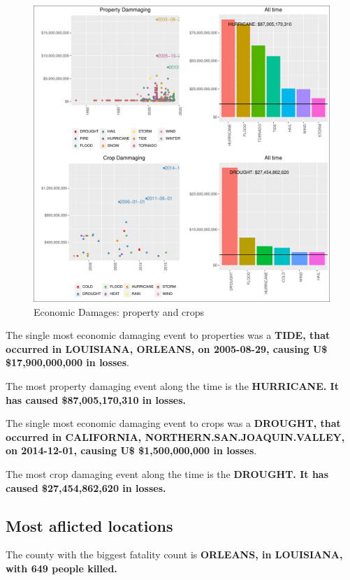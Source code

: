 \documentclass[]{article}
\begin{document}
\begin{figure}[htbp]
\centering
\includegraphics{readme_files/figure-latex/economic-plot-1.pdf}
\caption{Economic Damages: property and crops}
\end{figure}

The single most economic damaging event to properties was a
\textbf{TIDE, that occurred in LOUISIANA, ORLEANS, on 2005-08-29,
causing U\$ \$17,900,000,000 in losses}.

The most property damaging event along the time is the
\textbf{HURRICANE. It has caused \$87,005,170,310 in losses.}

The single most economic damaging event to crops was a \textbf{DROUGHT,
that occurred in CALIFORNIA, NORTHERN.SAN.JOAQUIN.VALLEY, on 2014-12-01,
causing U\$ \$1,500,000,000 in losses}.

The most crop damaging event along the time is the \textbf{DROUGHT. It
has caused \$27,454,862,620 in losses.}

\subsection{Most aflicted locations}\label{most-aflicted-locations-1}

The county with the biggest fatality count is \textbf{ORLEANS, in
LOUISIANA, with 649 people killed.}
\end{document}
